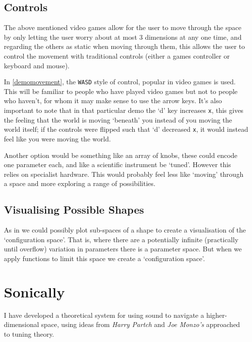 \subsection{Controls}
The above mentioned video games allow for the user to move through the space by
only letting the user worry about at most 3 dimensions at any one time, and
regarding the others as static when moving through them, this allows the user to
control the movement with traditional controls (either a games controller or
keyboard and mouse).

In \autoref{demomovement}, the \verb|WASD| style of control, popular in video
games is used. This will be familiar to people who have played video games but
not to people who haven't, for whom it may make sense to use the arrow keys.
It's also important to note that in that particular demo the `d' key increases
\verb|x|, this gives the feeling that the world is moving `beneath' you instead
of you moving the world itself; if the controls were flipped such that `d'
decreased \verb|x|, it would instead feel like you were moving the world. 

Another option would be something like an array of knobs, these could encode one
parameter each, and like a scientific instrument be `tuned'. However this relies
on specialist hardware. This would probably feel less like `moving' through a
space and more exploring a range of possibilities.

\subsection{Visualising Possible Shapes}
As in \cite{swayne:dsc2003} we could possibly plot sub-spaces of a shape to
create a visualisation of the `configuration space'. That is, where there are a
potentially infinite (practically until overflow) variation in parameters there
is a parameter space. But when we apply functions to limit this space we create
a `configuration space'.

\section{Sonically}
\label{sonicnav}
I have developed a theoretical system for using sound to navigate a
higher-dimensional space, using ideas from \emph{Harry Partch} and \emph{Joe
Monzo's} approached to tuning theory.
